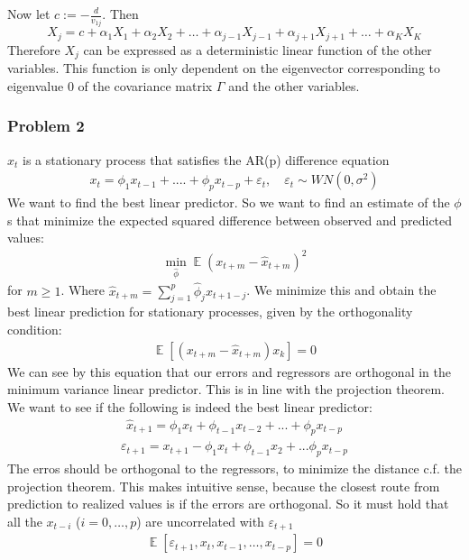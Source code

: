 \documentclass{article}
\DeclareMathOperator{\E}{\mathbb{E}}
\begin{document}
Now let $c := -\frac{d}{v_{1j}}$. Then
\begin{equation}
  \label{eq:8}
  X_j = c + \alpha_1 X_1 + \alpha_2 X_2 + \dots + \alpha_{j-1} X_{j-1} + \alpha_{j+1} X_{j+1}+ \dots + \alpha_K X_K
\end{equation}
Therefore $X_j$ can be expressed as a deterministic linear function of the other variables. This function is only dependent on the eigenvector corresponding to eigenvalue $0$ of the covariance matrix $\Gamma$ and the other variables. 

\subsubsection*{Problem 2}
$x_t$ is a stationary process that satisfies the AR(p) difference equation 
\begin{align*}
x_t = \phi_1x_{t-1}+....+\phi_px_{t-p}+\varepsilon_t,\quad \varepsilon_t \sim WN(0,\sigma^2)
\end{align*}
We want to find the best linear predictor. So we want to find an estimate of the $\phi$s that minimize the expected squared difference between observed and predicted values:
\begin{align*}
\min_{\hat \phi} \E \left(x_{t+m}-\hat{x}_{t+m}\right)^2 
\end{align*}
for $m\geq1$.
Where $\hat{x}_{t+m}=\sum^p_{j=1}\hat\phi_{j}x_{t+1-j}$. We minimize this and obtain the best linear prediction for stationary processes, given by the orthogonality condition: 
\begin{align*}
\E[(x_{t+m}-\hat x_{t+m})x_k]=0
\end{align*}
We can see by this equation that our errors and regressors are orthogonal in the minimum variance linear predictor. This is in line with the projection theorem. 
We want to see if the following is indeed the best linear predictor:
\begin{align*}
\hat{x}_{t+1}=\phi_1 x_t+\phi_{t-1}x_{t-2}+...+\phi_px_{t-p}
\end{align*}
\begin{align*}
\varepsilon_{t+1}=x_{t+1}-\phi_1 x_t+\phi_{t-1}x_2+...\phi_px_{t-p}
\end{align*}
The erros should be orthogonal to the regressors, to minimize the distance c.f. the projection theorem. This makes intuitive sense, because the closest route from prediction to realized values is if the errors are orthogonal. So it must hold that all the $x_{t-i}$ ($i=0, \dots, p$) are uncorrelated with $\varepsilon_{t+1}$
\begin{align*}
\E [\varepsilon_{t+1},x_t,x_{t-1}, \dots, x_{t-p}]=0 
\end{align*}
\end{document}
